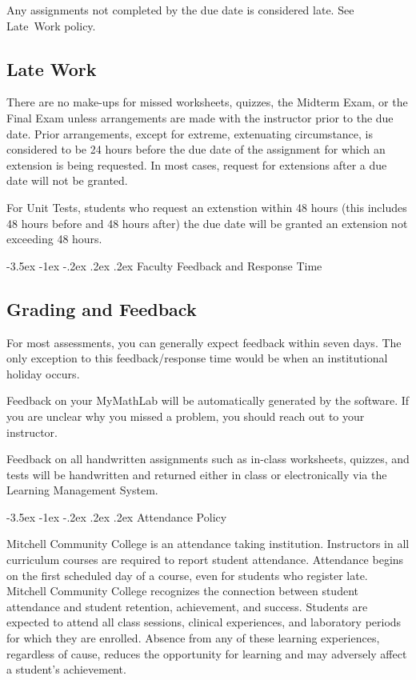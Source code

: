 \documentclass[11pt]{article}
\makeatletter
\renewcommand\section{\@startsection{section}{1}{0pt}%
  {-3.5ex \@plus -1ex \@minus -.2ex}%
  {.2ex \@plus.2ex}%
  {\normalfont\Large\bfseries}} %
\makeatother
\begin{document}
Any assignments not completed by the due date is considered late. See Late~Work policy.

\subsection{Late Work}

There are no make-ups for missed worksheets, quizzes, the Midterm Exam, or the Final Exam unless arrangements are made with the instructor prior to the due date. Prior arrangements, except for extreme, extenuating circumstance, is considered to be 24 hours before the due date of the assignment for which an extension is being requested. In most cases, request for extensions after a due date will not be granted.

For Unit Tests, students who request an extenstion within 48 hours (this includes 48 hours before and 48 hours after) the due date will be granted an extension not exceeding 48 hours.

\section{Faculty Feedback and Response Time}

\subsection{Grading and Feedback}

For most assessments, you can generally expect feedback within seven days. The only exception to this feedback/response time would be when an institutional holiday occurs.

Feedback on your MyMathLab will be automatically generated by the software. If you are unclear why you missed a problem, you should reach out to your instructor.

Feedback on all handwritten assignments such as in-class worksheets, quizzes, and tests will be handwritten and returned either in class or electronically via the Learning Management System.

\section{Attendance Policy}

Mitchell Community College is an attendance taking institution. Instructors in all curriculum courses are required to report student attendance. Attendance begins on the first scheduled day of a course, even for students who register late. Mitchell Community College recognizes the connection between student attendance and student retention, achievement, and success. Students are expected to attend all class sessions, clinical experiences, and laboratory periods for which they are enrolled. Absence from any of these learning experiences, regardless of cause, reduces the opportunity for learning and may adversely affect a student's achievement.
\end{document}
